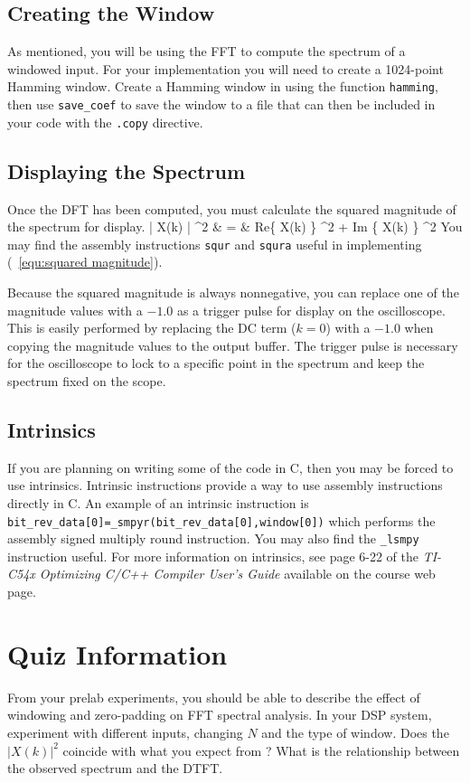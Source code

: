 

\subsection{Creating the Window}
As mentioned, you will be using the FFT to compute the spectrum
of a windowed input.  For your implementation you will need 
to create a 1024-point Hamming window.  
Create a Hamming window in \matlab using the function 
\verb+hamming+, then use \verb+save_coef+ to save the window
to a file that can then be included in your code with
the \verb+.copy+ directive.

\subsection{Displaying the Spectrum}

Once the DFT has been computed, you must calculate the
squared magnitude of the spectrum for display.
\bea
| X(k) | ^2 & = & \mbox{Re}\;\{ X(k) \} ^2 + \mbox{Im} \;\{ X(k) \} ^2
\label{equ:squared magnitude}
\eea
You may find the assembly instructions \verb+squr+ and \verb+squra+
useful in implementing (~\ref{equ:squared magnitude}).

Because the squared magnitude is always nonnegative, you can
replace one of the magnitude values with a $-1.0$ as a trigger pulse
for display on the oscilloscope.
This is easily performed by replacing the DC term ($k=0$) with
a $-1.0$ when copying the magnitude values to the output buffer.
The trigger pulse is necessary for the oscilloscope to
lock to a specific point in the spectrum and keep the
spectrum fixed on the scope.

\subsection{Intrinsics}
If you are planning on writing some of the code in C, then you 
may be forced to use intrinsics.  Intrinsic instructions provide a 
way to use assembly instructions directly in C.  An example of an 
intrinsic instruction is 
\verb+bit_rev_data[0]=_smpyr(bit_rev_data[0],window[0])+ which 
performs the assembly signed multiply round instruction.  You may also 
find the \verb+_lsmpy+ instruction useful.  For more information on 
intrinsics, see page 6-22 of the {\em TI-C54x Optimizing C/C++ Compiler 
User's Guide} available on the course web page.

\section{Quiz Information}
From your prelab experiments, you should be able to describe the 
effect of windowing and zero-padding on FFT spectral analysis.  
In your DSP system, experiment with different inputs, 
changing $N$ and the type of window.  Does the $|X(k)|^2$ coincide 
with what you expect from \matlab?  What is the relationship 
between the observed spectrum and the DTFT.

